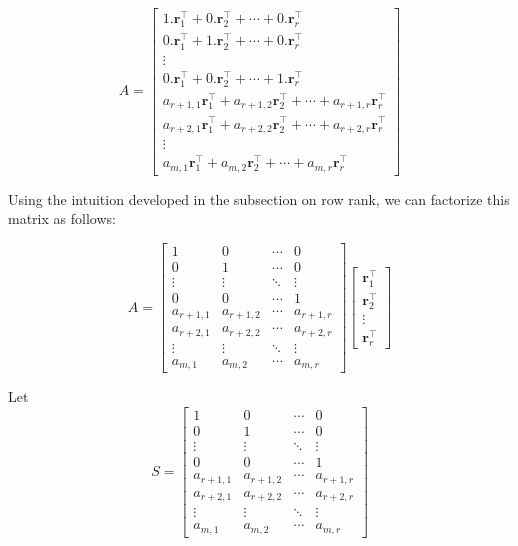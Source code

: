 \documentclass[a4paper]{article}
\begin{document}
\begin{equation}
A = \begin{bmatrix}
1.\boldsymbol{r}_1^{\top}+ 0.\boldsymbol{r}_2^{\top} + \cdots + 0.\boldsymbol{r}_r^{\top}   \\ 0.\boldsymbol{r}_1^{\top}+ 1.\boldsymbol{r}_2^{\top} + \cdots + 0.\boldsymbol{r}_r^{\top}  \\ \vdots \\ 
0.\boldsymbol{r}_1^{\top}+ 0.\boldsymbol{r}_2^{\top} + \cdots + 1.\boldsymbol{r}_r^{\top} \\
a_{r+1,1}\boldsymbol{r}_{1}^{\top} + a_{r+1,2}\boldsymbol{r}_{2}^{\top} + \cdots + a_{r+1,r}\boldsymbol{r}_{r}^{\top}\\ 
a_{r+2,1}\boldsymbol{r}_{1}^{\top} + a_{r+2,2}\boldsymbol{r}_{2}^{\top} + \cdots + a_{r+2,r}\boldsymbol{r}_{r}^{\top}\\ \vdots \\ 
a_{m,1}\boldsymbol{r}_{1}^{\top} + a_{m,2}\boldsymbol{r}_{2}^{\top} + \cdots + a_{m,r}\boldsymbol{r}_{r}^{\top}
\end{bmatrix}
\end{equation}

Using the intuition developed in the subsection on row rank, we can factorize this matrix as follows:

\begin{equation}
A = \begin{bmatrix}
1 & 0 & \cdots & 0   \\ 
0 & 1 & \cdots & 0   \\ 
\vdots & \vdots & \ddots & \vdots\\ 
0 & 0 & \cdots & 1 \\
a_{r+1,1} & a_{r+1,2} &\cdots & a_{r+1,r}\\ 
a_{r+2,1} &  a_{r+2,2} &\cdots & a_{r+2,r}\\ 
\vdots & \vdots & \ddots & \vdots\\ 
a_{m,1}& a_{m,2}& \cdots & a_{m,r}
\end{bmatrix} \begin{bmatrix}
\boldsymbol{r}_1^{\top} \\
\boldsymbol{r}_2^{\top} \\
\vdots \\
\boldsymbol{r}_r^{\top}
\end{bmatrix}
\end{equation}

Let \begin{equation}
S = \begin{bmatrix}
1 & 0 & \cdots & 0   \\ 
0 & 1 & \cdots & 0   \\ 
\vdots & \vdots & \ddots & \vdots\\ 
0 & 0 & \cdots & 1 \\
a_{r+1,1} & a_{r+1,2} &\cdots & a_{r+1,r}\\ 
a_{r+2,1} &  a_{r+2,2} &\cdots & a_{r+2,r}\\ 
\vdots & \vdots & \ddots & \vdots\\ 
a_{m,1}& a_{m,2}& \cdots & a_{m,r}
\end{bmatrix}
\end{equation}
\end{document}
